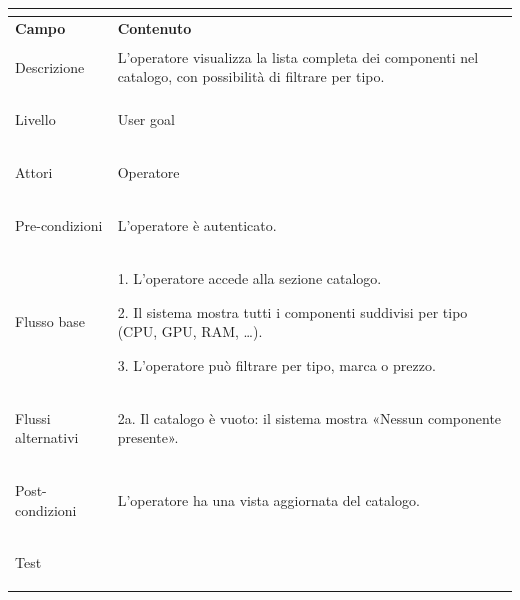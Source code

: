 \documentclass[11pt, a4paper]{article}
\begin{document}
\vspace{10pt}




\noindent

\begin{tabularx}{\textwidth}{|>{\bfseries}p{3.8cm}|X|}

\hline

\multicolumn{2}{|l|}{\textbf{UC12 --- Consulta catalogo}} \\

\hline

Campo & \textbf{Contenuto} \\

\hline

Descrizione & L'operatore visualizza la lista completa dei componenti nel catalogo, con possibilità di filtrare per tipo. \\

\hline

Livello & User goal \\

\hline

Attori & Operatore \\

\hline

Pre-condizioni & L'operatore è autenticato. \\

\hline

Flusso base & 

1. L'operatore accede alla sezione catalogo.\newline

2. Il sistema mostra tutti i componenti suddivisi per tipo (CPU, GPU, RAM, \dots).\newline

3. L'operatore può filtrare per tipo, marca o prezzo. \\

\hline

Flussi alternativi & 2a. Il catalogo è vuoto: il sistema mostra «Nessun componente presente». \\

\hline

Post-condizioni & L'operatore ha una vista aggiornata del catalogo. \\

\hline

Test & \\

\hline

\end{tabularx}
\end{document}
